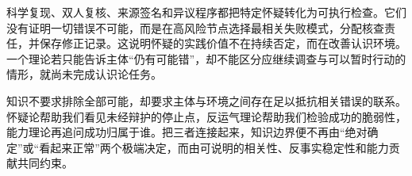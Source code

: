 科学复现、双人复核、来源签名和异议程序都把特定怀疑转化为可执行检查。它们没有证明一切错误不可能，而是在高风险节点选择最相关失败模式，分配核查责任，并保存修正记录。这说明怀疑的实践价值不在持续否定，而在改善认识环境。一个理论若只能告诉主体“仍有可能错”，却不能区分应继续调查与可以暂时行动的情形，就尚未完成认识论任务。

知识不要求排除全部可能，却要求主体与环境之间存在足以抵抗相关错误的联系。怀疑论帮助我们看见未经辩护的停止点，反运气理论帮助我们检验成功的脆弱性，能力理论再追问成功归属于谁。把三者连接起来，知识边界便不再由“绝对确定”或“看起来正常”两个极端决定，而由可说明的相关性、反事实稳定性和能力贡献共同约束。
